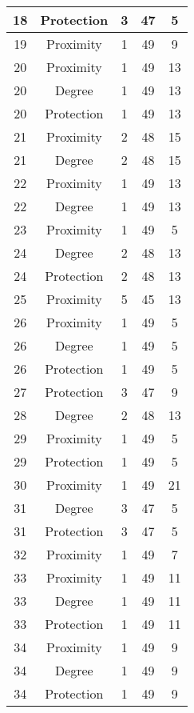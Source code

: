 \documentclass[results.tex]{subfiles}
\begin{document}
\begin{center}
\begin{tabular}{| c || c | c | c | c |}
    18 & Protection & 3 & 47 & 5 \\ 
    \hline
    19 & Proximity & 1 & 49 & 9 \\ 
    \hline
    20 & Proximity & 1 & 49 & 13 \\ 
    \hline
    20 & Degree & 1 & 49 & 13 \\ 
    \hline
    20 & Protection & 1 & 49 & 13 \\ 
    \hline
    21 & Proximity & 2 & 48 & 15 \\ 
    \hline
    21 & Degree & 2 & 48 & 15 \\ 
    \hline
    22 & Proximity & 1 & 49 & 13 \\ 
    \hline
    22 & Degree & 1 & 49 & 13 \\ 
    \hline
    23 & Proximity & 1 & 49 & 5 \\ 
    \hline
    24 & Degree & 2 & 48 & 13 \\ 
    \hline
    24 & Protection & 2 & 48 & 13 \\ 
    \hline
    25 & Proximity & 5 & 45 & 13 \\ 
    \hline
    26 & Proximity & 1 & 49 & 5 \\ 
    \hline
    26 & Degree & 1 & 49 & 5 \\ 
    \hline
    26 & Protection & 1 & 49 & 5 \\ 
    \hline
    27 & Protection & 3 & 47 & 9 \\ 
    \hline
    28 & Degree & 2 & 48 & 13 \\ 
    \hline
    29 & Proximity & 1 & 49 & 5 \\ 
    \hline
    29 & Protection & 1 & 49 & 5 \\ 
    \hline
    30 & Proximity & 1 & 49 & 21 \\ 
    \hline
    31 & Degree & 3 & 47 & 5 \\ 
    \hline
    31 & Protection & 3 & 47 & 5 \\ 
    \hline
    32 & Proximity & 1 & 49 & 7 \\ 
    \hline
    33 & Proximity & 1 & 49 & 11 \\ 
    \hline
    33 & Degree & 1 & 49 & 11 \\ 
    \hline
    33 & Protection & 1 & 49 & 11 \\ 
    \hline
    34 & Proximity & 1 & 49 & 9 \\ 
    \hline
    34 & Degree & 1 & 49 & 9 \\ 
    \hline
    34 & Protection & 1 & 49 & 9 \\ 
    \hline

\end{tabular}
\end{center}
\end{document}
